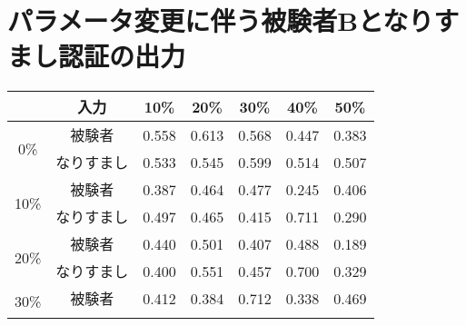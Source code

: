 \section{パラメータ変更に伴う被験者Bとなりすまし認証の出力\label{tune-b}}
\begin{center}
  \begin{longtable}[btph]{|c|c|r|r|r|r|r|}
    \hline
      \multicolumn{1}{|c|}{} & \multicolumn{1}{c|}{入力} & \multicolumn{1}{c|}{10\%} & \multicolumn{1}{c|}{20\%} & \multicolumn{1}{c|}{30\%} & \multicolumn{1}{c|}{40\%} & \multicolumn{1}{c|}{50\%} \\ \hline
      \multirow{2}{*}{0\%}  & 被験者 & 0.558 & 0.613 & 0.568 & 0.447 & 0.383 \\ \cline{2-7}
           & なりすまし & 0.533 & 0.545 & 0.599 & 0.514 & 0.507 \\ \hline
      \multirow{2}{*}{10\%} & 被験者 & 0.387 & 0.464 & 0.477 & 0.245 & 0.406 \\ \cline{2-7}
           & なりすまし & 0.497 & 0.465 & 0.415 & 0.711 & 0.290 \\ \hline
      \multirow{2}{*}{20\%} & 被験者 & 0.440 & 0.501 & 0.407 & 0.488 & 0.189 \\ \cline{2-7}
           & なりすまし & 0.400 & 0.551 & 0.457 & 0.700 & 0.329 \\ \hline
      \multirow{2}{*}{30\%} & 被験者 & 0.412 & 0.384 & 0.712 & 0.338 & 0.469 \\ \cline{2-7}

\end{longtable}
\end{center}
